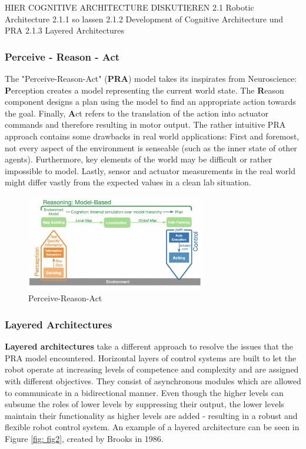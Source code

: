 \documentclass[]{article}
\begin{document}
	HIER COGNITIVE ARCHITECTURE DISKUTIEREN
	2.1 Robotic Architecture
	2.1.1 so lassen
	2.1.2 Development of Cognitive Architecture und PRA
	2.1.3 Layered Architectures
	
	\subsubsection{Perceive - Reason - Act}
	The "Perceive-Reason-Act" (\textbf{PRA}) model takes its inspirates from Neuroscience: \textbf{P}erception creates a model representing the current world state. The \textbf{R}eason component designs a plan using the model to find an appropriate action towards the goal. Finally, \textbf{A}ct refers to the translation of the action into actuator commands and therefore resulting in motor output. \autocite{schillingAutonomeSystemeUnd2023} The rather intuitive PRA approach contains some drawbacks in real world applications: First and foremost, not every aspect of the environment is senseable (such as the inner state of other agents). Furthermore, key elements of the world may be difficult or rather impossible to model. Lastly, sensor and actuator measurements in the real world might differ vastly from the expected values in a clean lab situation. \autocite{schillingAutonomeSystemeUnd2023}
	
	\begin{figure}[ht] 
		\centering
		\includegraphics[width=0.7\textwidth]{Graphics/PRA}
		\caption{Perceive-Reason-Act \autocite{schillingAutonomeSystemeUnd2023}}
		\label{fig: fig1}
	\end{figure}
	
	\subsubsection{Layered Architectures}
	\textbf{Layered architectures} take a different approach to resolve the issues that the PRA model encountered. Horizontal layers of control systems are built to let the robot operate at increasing levels of competence and complexity and are assigned with different objectives. They consist of asynchronous modules which are allowed to communicate in a bidirectional manner. \autocite{brooksRobustLayeredControl1986} 
	Even though the higher levels can subsume the roles of lower levels by suppressing their output, the lower levels maintain their functionality as higher levels are added - resulting in a robust and flexible robot control system. \autocite{brooksRobustLayeredControl1986} An example of a layered architecture can be seen in Figure \ref{fig: fig2}, created by Brooks in 1986. \autocite{brooksRobustLayeredControl1986}
	
\end{document}

